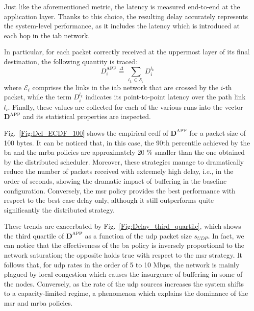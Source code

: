 Just like the aforementioned metric, the latency is measured end-to-end at the application layer. Thanks to this choice, the resulting delay accurately represents the system-level performance, as it includes the latency which is introduced at each hop in the \gls{iab} network.

In particular, for each packet correctly received at the uppermost layer of its final destination, the following quantity is traced:
\[ D^{\mathrm{APP}}_{i} \mathop = \limits^{\Delta} \, \sum_{l_k \, \in \, \mathcal{E}_{i}} D^{l_k}_i \] 
where $\mathcal{E}_{i}$  comprises the links in the \gls{iab} network that are crossed by the $i$-th packet, while the term $D^{l_k}_i$ indicates its point-to-point latency over the path link $l_i$. 
Finally, these values are collected for each of the various runs into the vector $\mathbf{D}^{\mathrm{APP}}$ and its statistical properties are inspected.

Fig.~\ref{Fig:Del_ECDF_100} shows the empirical \gls{ecdf} of $\mathbf{D}^{\mathrm{APP}}$ for a packet size of 100 bytes. It can be noticed that, in this case, the 90th percentile achieved by the \gls{ba} and the \gls{mrba} policies are approximately 20 \% smaller than the one obtained by the distributed scheduler. Moreover, these strategies manage to dramatically reduce the number of packets received with extremely high delay, i.e., in the order of seconds, showing the dramatic impact of buffering in the baseline configuration. Conversely, the \gls{msr} policy provides the best performance with respect to the best case delay only, although it still outperforms quite  significantly the distributed strategy. 

These trends are exacerbated by Fig.~\ref{Fig:Delay_third_quartile}, which shows the third quartile of $\mathbf{D}^{\mathrm{APP}}$ as a function of the \gls{udp} packet size $s_{UDP}$. In fact, we can notice that the effectiveness of the \gls{ba} policy is inversely proportional to the network saturation; the opposite holds true with respect to the \gls{msr} strategy. It follows that, for \gls{udp} rates in the order of 5 to 10 Mbps, the network is mainly plagued by local congestion which causes the insurgence of buffering in some of the nodes. Conversely, as the rate of the \gls{udp} sources increases the system shifts to a capacity-limited regime, a phenomenon which explains the dominance of the \gls{msr} and \gls{mrba} policies.

